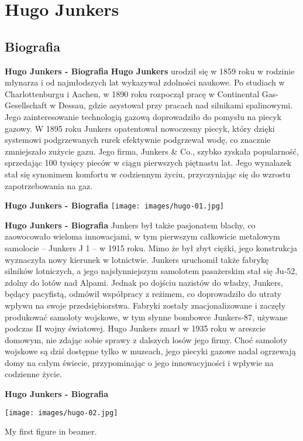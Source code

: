 
\section{ \textbf{Hugo Junkers}}

\subsection{Biografia}

\begin{frame}{\textbf{Hugo Junkers - Biografia}}
\textbf{Hugo Junkers} urodził się w 1859 roku w rodzinie młynarza i od najmłodszych lat wykazywał zdolności naukowe. Po studiach w Charlottenburgu i Aachen, w 1890 roku rozpoczął pracę w Continental Gas-Gesellschaft w Dessau, gdzie asystował przy pracach nad silnikami spalinowymi. Jego zainteresowanie technologią gazową doprowadziło do pomysłu na piecyk gazowy.
W 1895 roku Junkers opatentował nowoczesny piecyk, który dzięki systemowi podgrzewanych rurek efektywnie podgrzewał wodę, co znacznie zmniejszało zużycie gazu. Jego firma, Junkers \& Co., szybko zyskała popularność, sprzedając 100 tysięcy pieców w ciągu pierwszych piętnastu lat. Jego wynalazek stał się synonimem komfortu w codziennym życiu, przyczyniając się do wzrostu zapotrzebowania na gaz.
\end{frame}

\begin{frame}{\textbf{Hugo Junkers - Biografia}}
\texttt{[image: images/hugo-01.jpg]}
\end{frame}

\begin{frame}{\textbf{Hugo Junkers - Biografia}}
Junkers był także pasjonatem blachy, co zaowocowało wieloma innowacjami, w tym pierwszym całkowicie metalowym samolocie – Junkers J 1 – w 1915 roku. Mimo że był zbyt ciężki, jego konstrukcja wyznaczyła nowy kierunek w lotnictwie. Junkers uruchomił także fabrykę silników lotniczych, a jego najsłynniejszym samolotem pasażerskim stał się Ju-52, zdolny do lotów nad Alpami.
Jednak po dojściu nazistów do władzy, Junkers, będący pacyfistą, odmówił współpracy z reżimem, co doprowadziło do utraty wpływu na swoje przedsiębiorstwa. Fabryki zostały znacjonalizowane i zaczęły produkować samoloty wojskowe, w tym słynne bombowce Junkers-87, używane podczas II wojny światowej.
Hugo Junkers zmarł w 1935 roku w areszcie domowym, nie zdając sobie sprawy z dalszych losów jego firmy. Choć samoloty wojskowe są dziś dostępne tylko w muzeach, jego piecyki gazowe nadal ogrzewają domy na całym świecie, przypominając o jego innowacyjności i wpływie na codzienne życie.
\end{frame}

\begin{frame}{\textbf{Hugo Junkers - Biografia}}
	\begin{center}
		\texttt{[image: images/hugo-02.jpg]}
		\caption{My first figure in beamer.}
	\end{center}
\end{frame}